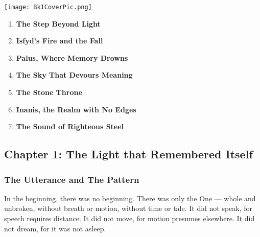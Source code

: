 \documentclass[12pt]{article}
\begin{document}
\vspace{.5in}

\begin{center}
    \texttt{[image: Bk1CoverPic.png]}
\end{center}

\vspace{.5in}

\begin{enumerate}
    \item \textbf{The Step Beyond Light} 

    \vspace{1em}
    \item \textbf{Isfyd's Fire and the Fall} 

    \vspace{1em}
    \item \textbf{Palus, Where Memory Drowns} 

    \vspace{1em}
    \item \textbf{The Sky That Devours Meaning} 

    \vspace{1em}
    \item \textbf{The Stone Throne} 

    \vspace{1em}
    \item \textbf{Inanis, the Realm with No Edges}

    \vspace{1em}
    \item \textbf{The Sound of Righteous Steel} 

\end{enumerate}

\newpage

\subsection*{Chapter 1: The Light that Remembered Itself}

\vspace{.5in}

\subsubsection*{The Utterance and The Pattern}

In the beginning, there was no beginning. There was only the One — whole and unbroken, without breath or motion, without time or tale.  
It did not speak, for speech requires distance.  
It did not move, for motion presumes elsewhere.  
It did not dream, for it was not asleep.
\end{document}

